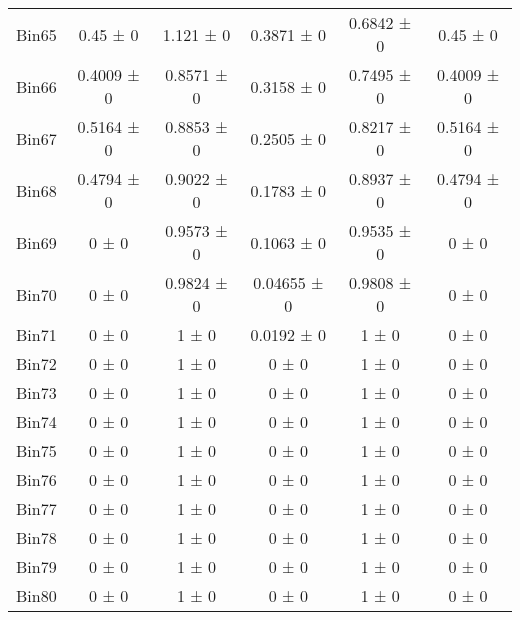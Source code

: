 \begin{tabular}{@{\extracolsep{4pt}}lccccc@{}}
     Bin65 & 0.45 ± 0 & 1.121 ± 0 & 0.3871 ± 0 & 0.6842 ± 0 & 0.45 ± 0 \\ 
     Bin66 & 0.4009 ± 0 & 0.8571 ± 0 & 0.3158 ± 0 & 0.7495 ± 0 & 0.4009 ± 0 \\ 
     Bin67 & 0.5164 ± 0 & 0.8853 ± 0 & 0.2505 ± 0 & 0.8217 ± 0 & 0.5164 ± 0 \\ 
     Bin68 & 0.4794 ± 0 & 0.9022 ± 0 & 0.1783 ± 0 & 0.8937 ± 0 & 0.4794 ± 0 \\ 
     Bin69 & 0 ± 0 & 0.9573 ± 0 & 0.1063 ± 0 & 0.9535 ± 0 & 0 ± 0 \\ 
     Bin70 & 0 ± 0 & 0.9824 ± 0 & 0.04655 ± 0 & 0.9808 ± 0 & 0 ± 0 \\ 
     Bin71 & 0 ± 0 & 1 ± 0 & 0.0192 ± 0 & 1 ± 0 & 0 ± 0 \\ 
     Bin72 & 0 ± 0 & 1 ± 0 & 0 ± 0 & 1 ± 0 & 0 ± 0 \\ 
     Bin73 & 0 ± 0 & 1 ± 0 & 0 ± 0 & 1 ± 0 & 0 ± 0 \\ 
     Bin74 & 0 ± 0 & 1 ± 0 & 0 ± 0 & 1 ± 0 & 0 ± 0 \\ 
     Bin75 & 0 ± 0 & 1 ± 0 & 0 ± 0 & 1 ± 0 & 0 ± 0 \\ 
     Bin76 & 0 ± 0 & 1 ± 0 & 0 ± 0 & 1 ± 0 & 0 ± 0 \\ 
     Bin77 & 0 ± 0 & 1 ± 0 & 0 ± 0 & 1 ± 0 & 0 ± 0 \\ 
     Bin78 & 0 ± 0 & 1 ± 0 & 0 ± 0 & 1 ± 0 & 0 ± 0 \\ 
     Bin79 & 0 ± 0 & 1 ± 0 & 0 ± 0 & 1 ± 0 & 0 ± 0 \\ 
     Bin80 & 0 ± 0 & 1 ± 0 & 0 ± 0 & 1 ± 0 & 0 ± 0 \\ 
\hline\hline
  \end{tabular}
